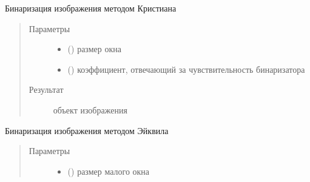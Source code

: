 \documentclass[letterpaper,10pt,russian]{sphinxmanual}
\begin{document}
\begin{fulllineitems}
\begin{fulllineitems}
\end{fulllineitems}


\begin{fulllineitems}
\label{\detokenize{BinaryImage:BinaryImage.BinaryImage.cristian_binarisation}}
Бинаризация изображения методом Кристиана
\begin{quote}\begin{description}
\item[{Параметры}] \leavevmode\begin{itemize}
\item {} 
 () \textendash{} размер окна

\item {} 
 () \textendash{} коэффициент, отвечающий за чувствительность бинаризатора

\end{itemize}

\item[{Результат}] \leavevmode
{\hyperref[\detokenize{BaseImage:core.LabImage}]{}} \textendash{} объект изображения

\end{description}\end{quote}

\end{fulllineitems}


\begin{fulllineitems}
\label{\detokenize{BinaryImage:BinaryImage.BinaryImage.eikvil_binarisation}}
Бинаризация изображения методом Эйквила
\begin{quote}\begin{description}
\item[{Параметры}] \leavevmode\begin{itemize}
\item {} 
 () \textendash{} размер малого окна


\end{itemize}
\end{description}
\end{quote}
\end{fulllineitems}
\end{fulllineitems}
\end{document}

